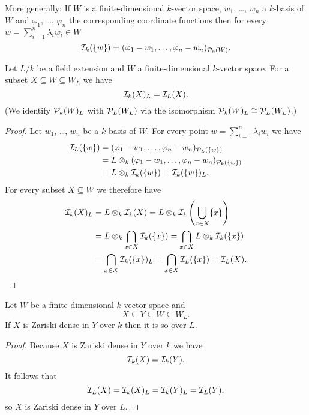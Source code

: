 More generally: If $W$ is a finite-dimensional $k$-vector space, $w_1$, \dots, $w_n$ a $k$-basis of $W$ and $\varphi_1$, \dots, $\varphi_n$ the corresponding coordinate functions then for every $w = \sum_{i=1}^n \lambda_i w_i \in W$
\[
 \mathcal{I}_k(\{w\}) = (\varphi_1 - w_1, \dotsc, \varphi_n - w_n)_{\mathcal{P}_k(W)}.
\]


\begin{lem}
 Let $L/k$ be a field extension and $W$ a finite-dimensional $k$-vector space. For a subset $X \subseteq W \subseteq W_L$ we have
 \[
  \mathcal{I}_k(X)_L = \mathcal{I}_L(X).
 \]
 (We identify $\mathcal{P}_k(W)_L$ with $\mathcal{P}_L(W_L)$ via the isomorphism $\mathcal{P}_k(W)_L \cong \mathcal{P}_L(W_L)$.)
\end{lem}
\begin{proof}
 Let $w_1$, \dots, $w_n$ be a $k$-basis of $W$. For every point $w = \sum_{i=1}^n \lambda_i w_i$ we have
 \begin{align*}
  \mathcal{I}_L(\{w\})
  &= (\varphi_1 - w_1, \dotsc, \varphi_n - w_n)_{\mathcal{P}_L(\{w\})} \\
  &= L \otimes_k (\varphi_1 - w_1, \dotsc, \varphi_n - w_n)_{\mathcal{P}_k(\{w\})} \\
  &= L \otimes_k \mathcal{I}_k(\{w\})
  = \mathcal{I}_k(\{w\})_L.
 \end{align*}
 For every subset $X \subseteq W$ we therefore have
 \begin{align*}
  \mathcal{I}_k(X)_L
  &= L \otimes_k \mathcal{I}_k(X)
  = L \otimes_k \mathcal{I}_k\left(\bigcup_{x \in X} \{x\}\right) \\
  &= L \otimes_k \bigcap_{x \in X} \mathcal{I}_k(\{x\})
  = \bigcap_{x \in X} L \otimes_k \mathcal{I}_k(\{x\}) \\
  &= \bigcap_{x \in X} \mathcal{I}_k(\{x\})_L
  = \bigcap_{x \in X} \mathcal{I}_L(\{x\})
  = \mathcal{I}_L(X).
 \end{align*}
\end{proof}


\begin{cor}\label{cor: Zariski dense scalar extension}
 Let $W$ be a finite-dimensional $k$-vector space and
 \[
  X \subseteq Y \subseteq W \subseteq W_L.
 \]
 If $X$ is Zariski dense in $Y$ over $k$ then it is so over $L$.
\end{cor}
\begin{proof}
 Because $X$ is Zariski dense in $Y$ over $k$ we have
 \[
  \mathcal{I}_k(X) = \mathcal{I}_k(Y).
 \]
 It follows that
 \[
  \mathcal{I}_L(X) = \mathcal{I}_k(X)_L = \mathcal{I}_k(Y)_L = \mathcal{I}_L(Y),
 \]
 so $X$ is Zariski dense in $Y$ over $L$.
\end{proof}



